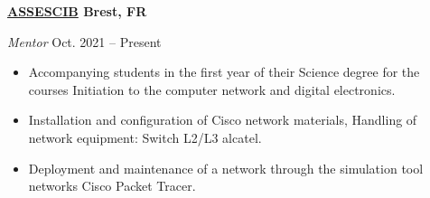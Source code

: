 \textbf{\href{https://assescib.fr/}{ASSESCIB} \hfill  Brest, FR} \par
\textit{Mentor } \hfill Oct. 2021 -- Present \par
\begin{itemize}
	\item Accompanying students in the first year of their Science degree for the courses Initiation to the computer network and digital electronics.
	\item Installation and configuration of Cisco network materials, Handling of network equipment: Switch L2/L3 alcatel.
	\item Deployment and maintenance of a network through the simulation tool networks Cisco Packet Tracer.
\end{itemize} \par
